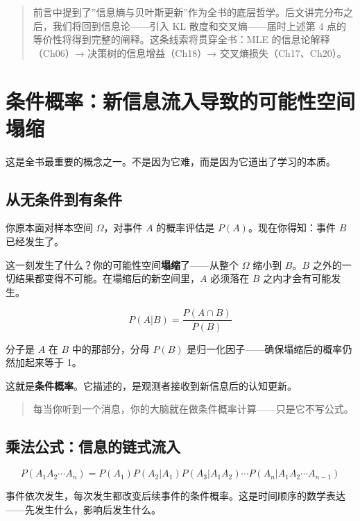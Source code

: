 \documentclass[
]{book}
\begin{document}
\begin{quote}
前言中提到了''信息熵与贝叶斯更新''作为全书的底层哲学。后文讲完分布之后，我们将回到信息论------引入 KL 散度和交叉熵------届时上述第 4 点的等价性将得到完整的阐释。这条线索将贯穿全书：MLE 的信息论解释（Ch06）→ 决策树的信息增益（Ch18）→ 交叉熵损失（Ch17、Ch20）。
\end{quote}

\section{条件概率：新信息流入导致的可能性空间塌缩}\label{ux6761ux4ef6ux6982ux7387ux65b0ux4fe1ux606fux6d41ux5165ux5bfcux81f4ux7684ux53efux80fdux6027ux7a7aux95f4ux584cux7f29}

这是全书最重要的概念之一。不是因为它难，而是因为它道出了学习的本质。

\subsection{从无条件到有条件}\label{ux4eceux65e0ux6761ux4ef6ux5230ux6709ux6761ux4ef6}

你原本面对样本空间 \(\Omega\)，对事件 \(A\) 的概率评估是 \(P(A)\)。现在你得知：事件 \(B\) 已经发生了。

这一刻发生了什么？你的可能性空间\textbf{塌缩}了------从整个 \(\Omega\) 缩小到 \(B\)。\(B\) 之外的一切结果都变得不可能。在塌缩后的新空间里，\(A\) 必须落在 \(B\) 之内才会有可能发生。

\[P(A|B) = \frac{P(A \cap B)}{P(B)}\]

分子是 \(A\) 在 \(B\) 中的那部分，分母 \(P(B)\) 是归一化因子------确保塌缩后的概率仍然加起来等于 1。

这就是\textbf{条件概率}。它描述的，是观测者接收到新信息后的认知更新。

\begin{quote}
每当你听到一个消息，你的大脑就在做条件概率计算------只是它不写公式。
\end{quote}

\subsection{乘法公式：信息的链式流入}\label{ux4e58ux6cd5ux516cux5f0fux4fe1ux606fux7684ux94feux5f0fux6d41ux5165}

\[P(A_1 A_2 \cdots A_n) = P(A_1) P(A_2|A_1) P(A_3|A_1 A_2) \cdots P(A_n|A_1 A_2 \cdots A_{n-1})\]

事件依次发生，每次发生都改变后续事件的条件概率。这是时间顺序的数学表达------先发生什么，影响后发生什么。
\end{document}
